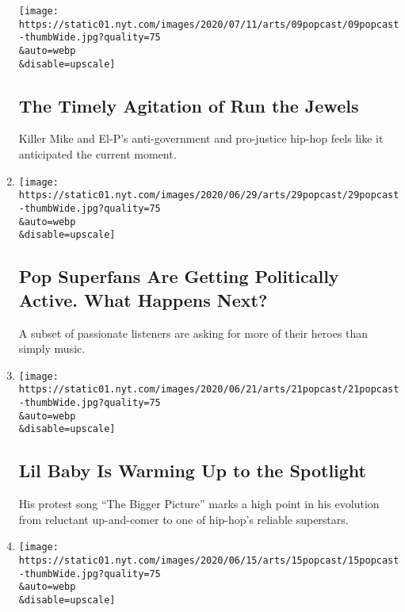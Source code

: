 \begin{enumerate}
  \texttt{[image: https://static01.nyt.com/images/2020/07/11/arts/09popcast/09popcast-thumbWide.jpg?quality=75\\\&auto=webp\\\&disable=upscale]}

  \hypertarget{the-timely-agitation-of-run-the-jewels}{%
  \subsection{The Timely Agitation of Run the
  Jewels}\label{the-timely-agitation-of-run-the-jewels}}

  Killer Mike and El-P's anti-government and pro-justice hip-hop feels
  like it anticipated the current moment.
\item
  \href{/2020/06/30/arts/music/popcast-superfans-politics.html}{}

  \texttt{[image: https://static01.nyt.com/images/2020/06/29/arts/29popcast/29popcast-thumbWide.jpg?quality=75\\\&auto=webp\\\&disable=upscale]}

  \hypertarget{pop-superfans-are-getting-politically-active-what-happens-next}{%
  \subsection{Pop Superfans Are Getting Politically Active. What Happens
  Next?}\label{pop-superfans-are-getting-politically-active-what-happens-next}}

  A subset of passionate listeners are asking for more of their heroes
  than simply music.
\item
  \href{/2020/06/21/arts/music/popcast-lil-baby.html}{}

  \texttt{[image: https://static01.nyt.com/images/2020/06/21/arts/21popcast/21popcast-thumbWide.jpg?quality=75\\\&auto=webp\\\&disable=upscale]}

  \hypertarget{lil-baby-is-warming-up-to-the-spotlight}{%
  \subsection{Lil Baby Is Warming Up to the
  Spotlight}\label{lil-baby-is-warming-up-to-the-spotlight}}

  His protest song ``The Bigger Picture'' marks a high point in his
  evolution from reluctant up-and-comer to one of hip-hop's reliable
  superstars.
\item
  \href{/2020/06/15/arts/music/popcast-urban-music.html}{}

  \texttt{[image: https://static01.nyt.com/images/2020/06/15/arts/15popcast/15popcast-thumbWide.jpg?quality=75\\\&auto=webp\\\&disable=upscale]}


\end{enumerate}
